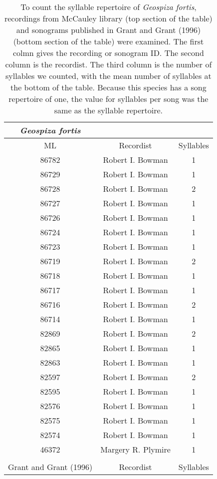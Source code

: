 \documentclass[a4paper,12pt]{article}
\begin{document}
\clearpage
\begin{longtable}{ccc}
\caption{To count the syllable repertoire of \textit{Geospiza fortis}, recordings from McCauley library (top section of the table) and sonograms published in Grant and Grant (1996) (bottom section of the table) were examined.  The first colmn gives the recording or sonogram ID.  The second column is the recordist.  The third column is the number of syllables we counted, with the mean number of syllables at the bottom of the table.  Because this species has a song repertoire of one, the value for syllables per song was the same as the syllable repertoire.}\\
\hline
\textit{Geospiza fortis} & & \\
\hline
ML & Recordist & Syllables  \\
\hline
  86782 & Robert I. Bowman  & 1 \\ 
  86729 & Robert I. Bowman  & 1 \\ 
  86728 & Robert I. Bowman  & 2 \\ 
  86727 & Robert I. Bowman  & 1 \\ 
  86726 & Robert I. Bowman  & 1 \\ 
  86724 & Robert I. Bowman  & 1 \\ 
  86723 & Robert I. Bowman  & 1 \\ 
  86719 & Robert I. Bowman  & 2 \\ 
  86718 & Robert I. Bowman  & 1 \\ 
  86717 & Robert I. Bowman  & 1 \\ 
  86716 & Robert I. Bowman  & 2 \\ 
  86714 & Robert I. Bowman  & 1 \\ 
  82869 & Robert I. Bowman  & 2 \\ 
  82865 & Robert I. Bowman  & 1 \\ 
  82863 & Robert I. Bowman  & 1 \\ 
  82597 & Robert I. Bowman  & 2 \\ 
  82595 & Robert I. Bowman  & 1 \\ 
  82576 & Robert I. Bowman  & 1 \\ 
  82575 & Robert I. Bowman  & 1 \\ 
  82574 & Robert I. Bowman  & 1 \\ 
  46372 & Margery R. Plymire  & 1 \\
  \hline
  \\
  Grant and Grant (1996) &  Recordist & Syllables  \\

\end{longtable}
\end{document}

